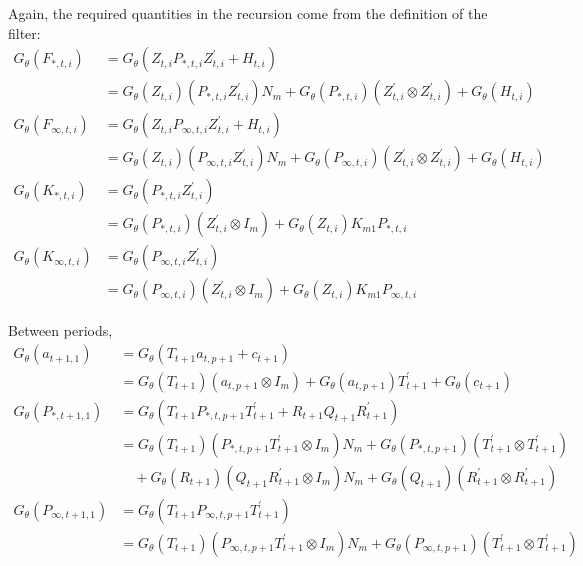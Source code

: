 \documentclass[12pt]{article}
\newcommand{\Gt}{G_\theta}
\begin{document}
	Again, the required quantities in the recursion come from the definition of the filter: 
	\begin{align*}
	\Gt(F_{*,t,i}) &= \Gt(Z_{t,i} P_{*,t,i} Z_{t,i}^\prime + H_{t,i}) \\
	&= \Gt(Z_{t,i})(P_{*,t,i} Z_{t,i}^\prime) N_m + \Gt(P_{*,t,i}) (Z_{t,i}^\prime \otimes Z_{t,i}^\prime) + \Gt(H_{t,i}) \\
	\Gt(F_{\infty,t,i}) &= \Gt(Z_{t,i} P_{\infty,t,i} Z_{t,i}^\prime + H_{t,i}) \\
	&= \Gt(Z_{t,i})(P_{\infty,t,i} Z_{t,i}^\prime) N_m + \Gt(P_{\infty,t,i}) (Z_{t,i}^\prime \otimes Z_{t,i}^\prime) + \Gt(H_{t,i}) \\
	\Gt(K_{*,t,i}) &= \Gt(P_{*,t,i} Z_{t,i}^\prime) \\
	&= \Gt(P_{*,t,i}) (Z_{t,i}^\prime \otimes I_m) + \Gt(Z_{t,i}) K_{m1} P_{*,t,i} \\
	\Gt(K_{\infty,t,i}) &= \Gt(P_{\infty,t,i} Z_{t,i}^\prime) \\
	&= \Gt(P_{\infty,t,i}) (Z_{t,i}^\prime \otimes I_m) + \Gt(Z_{t,i}) K_{m1} P_{\infty,t,i} 
	\end{align*}

	Between periods, 
	\begin{align*}
	\Gt(a_{t+1,1}) &= \Gt(T_{t+1} a_{t,p+1} + c_{t+1}) \\
	&= \Gt(T_{t+1}) (a_{t,p+1} \otimes I_m) + \Gt(a_{t,p+1}) T_{t+1}^\prime + \Gt(c_{t+1})\\ 
	\Gt(P_{*,t+1,1}) &= \Gt(T_{t+1} P_{*,t,p+1} T_{t+1}^\prime + R_{t+1} Q_{t+1} R_{t+1}^\prime) \\
	&= \Gt(T_{t+1})(P_{*,t,p+1} T_{t+1}^\prime \otimes I_m) N_m + \Gt(P_{*,t,p+1})(T_{t+1}^\prime \otimes T_{t+1}^\prime) \\
	&\quad + \Gt(R_{t+1})(Q_{t+1} R_{t+1}^\prime \otimes I_m) N_m + \Gt(Q_{t+1})(R_{t+1}^\prime \otimes R_{t+1}^\prime) \\
	\Gt(P_{\infty,t+1,1}) &= \Gt(T_{t+1} P_{\infty,t,p+1} T_{t+1}^\prime) \\
	&= \Gt(T_{t+1})(P_{\infty,t,p+1} T_{t+1}^\prime \otimes I_m) N_m + \Gt(P_{\infty,t,p+1})(T_{t+1}^\prime \otimes T_{t+1}^\prime)
	\end{align*}
\end{document}
